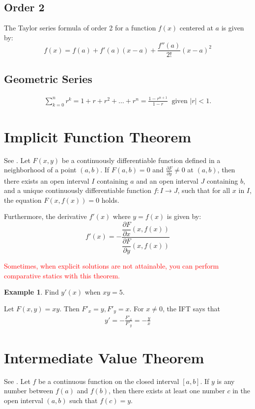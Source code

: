 \documentclass[11pt,a4paper]{book}
\newcommand{\red}[1]{\textcolor{red}{#1}}
\theoremstyle{definition}\newtheorem{definition}{Definition}
\theoremstyle{definition}\newtheorem{fact}{Fact}
\theoremstyle{definition}\newtheorem{remark}{Remark}
\theoremstyle{definition}\newtheorem{ex}{Ex.}
\theoremstyle{definition}\newtheorem{project}{Project}
\theoremstyle{definition}\newtheorem{problem}{Problem}
\theoremstyle{definition}\newtheorem{example}{Example}
\numberwithin{theorem}{section}
\numberwithin{corollary}{chapter}
\numberwithin{assumption}{chapter}
\numberwithin{definition}{chapter}
\numberwithin{prop}{chapter}
\numberwithin{notation}{chapter}
\numberwithin{problem}{chapter}
\numberwithin{example}{chapter}
\numberwithin{fact}{chapter}
\numberwithin{ex}{chapter}
\begin{document}
\begin{appendices}
	\subsection*{Order 2}
	The Taylor series formula of order 2 for a function $f(x)$ centered at $a$ is given by:
	\[
	f(x) = f(a) + f'(a)(x - a) + \frac{f''(a)}{2!}(x - a)^2
	\]
	
	\subsection*{Geometric Series}
	\begin{align*}
		\sum^n_{k=0} r^k = 1 + r + r^2 + \dots + r^n = \frac{1 - r^{n+1}}{1-r} \ \text{ given $|r| < 1$.}
	\end{align*}
	
	\section{Implicit Function Theorem}
	See \citet[Ch 10.6]{springcamp}. Let \( F(x, y) \) be a continuously differentiable function defined in a neighborhood of a point \( (a, b) \). If \( F(a, b) = 0 \) and \( \frac{\partial F}{\partial y} \neq 0 \) at \( (a, b) \), then there exists an open interval \( I \) containing \( a \) and an open interval \( J \) containing \( b \), and a unique continuously differentiable function \( f : I \to J \), such that for all \( x \) in \( I \), the equation \( F(x, f(x)) = 0 \) holds.
	
	Furthermore, the derivative \( f'(x) \) where $y = f(x)$ is given by:
	\[ f'(x) = -\dfrac{\dfrac{\partial F}{\partial x}(x, f(x))}{\dfrac{\partial F}{\partial y}(x, f(x))} \]
	
	\red{Sometimes, when explicit solutions are not attainable, you can perform comparative statics with this theorem.} 	
	\begin{example}
		Find $y'(x)$ when $xy=5$.
		
		Let $F(x,y) = xy$. Then $F'_x = y, F'_y = x$. For $x\neq 0$, the IFT says that
		\begin{align*}
			y' = - \frac{F'_x}{F'_y} = - \frac{y}{x} 
		\end{align*}
	\end{example}
	
	
	\section{Intermediate Value Theorem}
	See \citet[Ch 6.10]{springcamp}. Let \( f \) be a continuous function on the closed interval \([a, b]\). If \( y \) is any number between \( f(a) \) and \( f(b) \), then there exists at least one number \( c \) in the open interval \((a, b)\) such that \( f(c) = y \).
	

\end{appendices}
\end{document}
